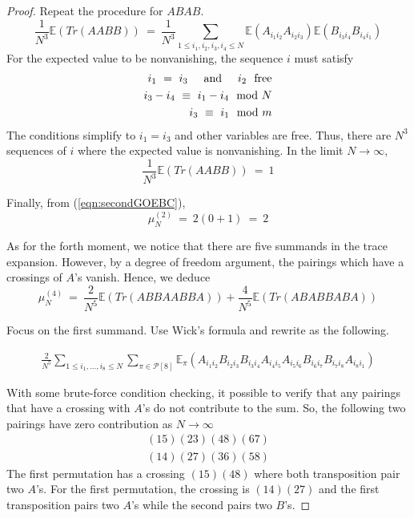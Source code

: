 \documentclass{article}
\newcommand{\textAnd}{
    {
        \hspace{5mm}
        \textrm{and}
        \hspace{5mm}
    }
}
\begin{document}
\begin{proof}
Repeat the procedure for $ABAB$. 
\begin{equation}
    \frac 1 {N^{3}} \mathbb{E}(Tr(AABB)) \
    =  \
    \frac 1 {N^3} 
    \sum_{1 \leq i_1, i_2, i_3, i_4 \leq N}
    \mathbb{E} (
        A_{i_1i_2}A_{i_2i_3}
    )
\mathbb{E} (
        B_{i_3i_4}B_{i_4i_1}
    )
\end{equation}
For the expected value to be nonvanishing, the sequence $i$ must satisfy 
\begin{eqnarray}
    i_1 \ = \ i_3 \textAnd i_2 \ \  \textrm{free} \\
    i_3 - i_4 \ \equiv \ i_1 - i_4 \mod N \\
    i_3 \ \equiv \ i_1 \mod m
\end{eqnarray}
The conditions simplify to $i_1 = i_3$ and other variables are free. 
Thus, there are $N^3$ sequences of $i$ where the expected value is 
nonvanishing. In the limit $N\rightarrow \infty$, 
\begin{equation}
    \frac 1 {N^{3}} \mathbb{E}(Tr(AABB)) \
    =  \ 1
\end{equation}

Finally, from (\ref{eqn:secondGOEBC}), 
\[
    \mu_N^{(2)} \ = \ 2 (0 + 1) \ = \ 2
\]

As for the forth moment, we notice that there are five summands in the 
trace expansion. However, by a degree of freedom argument, the pairings 
which have a crossings of $A$'s vanish. Hence, we deduce 
\begin{equation}
    \label{eqn:forthGOEBC}
    \mu_N^{(4)} \ = \ \frac 2 {N^{5}} \mathbb{E}(Tr(ABBAABBA)) + \frac 4 {N^5}\mathbb{E}(Tr(ABABBABA))
\end{equation}

Focus on the first summand. Use Wick's formula and rewrite as the following. 

\begin{equation}
    \begin{split}
\frac{2}{N^5} \sum_{1 \leq i_1, \dots,  i_8 \leq N} 
\sum_{\pi \in \mathcal{P}[8]} \mathbb{E}_\pi \left( A_{i_1i_2} B_{i_2i_3} B_{i_3i_4} A_{i_4i_5} A_{i_5i_6} B_{i_6i_7} B_{i_7i_8} A_{i_8i_1} \right)
    \end{split}
\end{equation}



With some brute-force condition checking, it possible to verify that 
any pairings that have a crossing with $A$'s do not contribute to the sum. 
So, the following two pairings have zero contribution as $N\rightarrow \infty$
\begin{eqnarray}
    (15)(23)(48)(67) \\ 
    (14)(27)(36)(58)
\end{eqnarray}
The first permutation has a crossing $(15)(48)$ where both transposition 
pair two $A$'s. For the first permutation, the crossing is $(14)(27)$ and 
the first transposition pairs two $A$'s while the second pairs two $B$'s. 


\end{proof}
\end{document}
